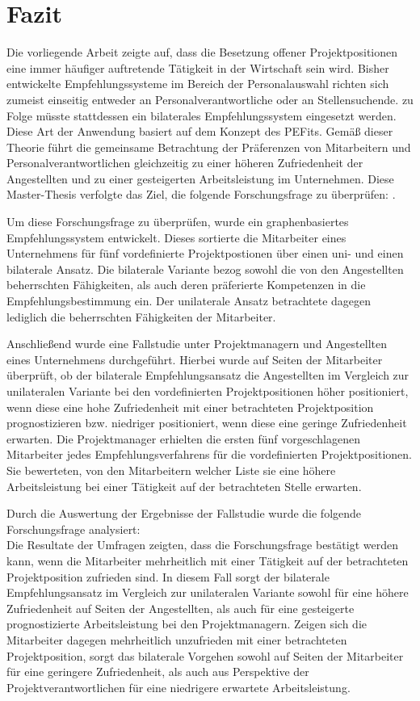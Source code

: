 \chapter{Fazit}
\label{ch:fazit}
Die vorliegende Arbeit zeigte auf, dass die Besetzung offener Projektpositionen eine immer häufiger auftretende Tätigkeit in der Wirtschaft sein wird. Bisher entwickelte Empfehlungssysteme im Bereich der Personalauswahl richten sich zumeist einseitig entweder an Personalverantwortliche oder an Stellensuchende. \textcite[S. 1ff.]{malinowski:2006} zu Folge müsste stattdessen ein bilaterales Empfehlungssystem eingesetzt werden. Diese Art der Anwendung basiert auf dem Konzept des \aclp{PEFit}. Gemäß dieser Theorie führt die gemeinsame Betrachtung der Präferenzen von Mitarbeitern und Personalverantwortlichen gleichzeitig zu einer höheren Zufriedenheit der Angestellten und zu einer gesteigerten Arbeitsleistung im Unternehmen. Diese Master-Thesis verfolgte das Ziel, die folgende Forschungsfrage zu überprüfen: \forschungsfrage.

Um diese Forschungsfrage zu überprüfen, wurde ein graphenbasiertes Empfehlungssystem entwickelt. Dieses sortierte die Mitarbeiter eines Unternehmens für fünf vordefinierte Projektpostionen über einen uni- und einen bilaterale Ansatz. Die bilaterale Variante bezog sowohl die von den Angestellten beherrschten Fähigkeiten, als auch deren präferierte Kompetenzen in die Empfehlungsbestimmung ein. Der unilaterale Ansatz betrachtete dagegen lediglich die beherrschten Fähigkeiten der Mitarbeiter.

Anschließend wurde eine Fallstudie unter Projektmanagern und Angestellten eines Unternehmens durchgeführt. Hierbei wurde auf Seiten der Mitarbeiter überprüft, ob der bilaterale Empfehlungsansatz die Angestellten im Vergleich zur unilateralen Variante bei den vordefinierten Projektpositionen höher positioniert, wenn diese eine hohe Zufriedenheit mit einer betrachteten Projektposition prognostizieren bzw. niedriger positioniert, wenn diese eine geringe Zufriedenheit erwarten. Die Projektmanager erhielten die ersten fünf vorgeschlagenen Mitarbeiter jedes Empfehlungsverfahrens für die vordefinierten Projektpositionen. Sie bewerteten, von den Mitarbeitern welcher Liste sie eine höhere Arbeitsleistung bei einer Tätigkeit auf der betrachteten Stelle erwarten.

Durch die Auswertung der Ergebnisse der Fallstudie wurde die folgende Forschungsfrage analysiert: \forschungsfrage\\
Die Resultate der Umfragen zeigten, dass die Forschungsfrage bestätigt werden kann, wenn die Mitarbeiter mehrheitlich mit einer Tätigkeit auf der betrachteten Projektposition zufrieden sind. In diesem Fall sorgt der bilaterale Empfehlungsansatz im Vergleich zur unilateralen Variante sowohl für eine höhere Zufriedenheit auf Seiten der Angestellten, als auch für eine gesteigerte prognostizierte Arbeitsleistung bei den Projektmanagern. Zeigen sich die Mitarbeiter dagegen mehrheitlich unzufrieden mit einer betrachteten Projektposition, sorgt das bilaterale Vorgehen sowohl auf Seiten der Mitarbeiter für eine geringere Zufriedenheit, als auch aus Perspektive der Projektverantwortlichen für eine niedrigere erwartete Arbeitsleistung.

